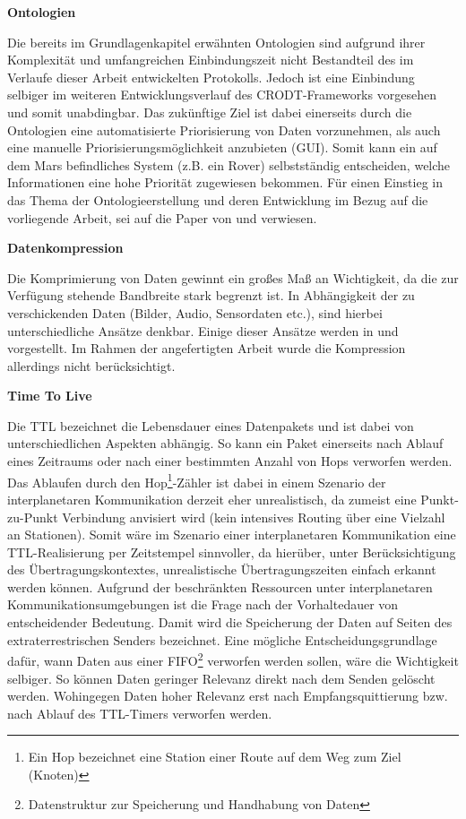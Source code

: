 \label{sec:Vorueberlegung}

\textbf{Ontologien}

Die bereits im Grundlagenkapitel erw{\"a}hnten Ontologien sind aufgrund ihrer
Komplexit{\"a}t und umfangreichen Einbindungszeit nicht Bestandteil des im
Verlaufe dieser Arbeit entwickelten Protokolls. Jedoch ist eine Einbindung
selbiger im weiteren Entwicklungsverlauf des CRODT-Frameworks vorgesehen und
somit unabdingbar.
Das zuk{\"u}nftige Ziel ist dabei einerseits durch die Ontologien eine
automatisierte Priorisierung von Daten vorzunehmen, als auch eine manuelle
Priorisierungsm{\"o}glichkeit anzubieten (\gls{GUI}). Somit kann ein auf dem
Mars befindliches System (z.B. ein Rover) selbstst{\"a}ndig entscheiden, welche
Informationen eine hohe Priorit{\"a}t zugewiesen bekommen. F{\"u}r einen
Einstieg in das Thema der Ontologieerstellung und deren Entwicklung im Bezug
auf die vorliegende Arbeit, sei auf die Paper von \cite{Noy2000} und \cite{Daher} verwiesen.

\textbf{Datenkompression}

Die Komprimierung von Daten gewinnt ein gro{\ss}es Ma{\ss} an Wichtigkeit, da
die zur Verf{\"u}gung stehende Bandbreite stark begrenzt ist. In Abh{\"a}ngigkeit der zu
verschickenden Daten (Bilder, Audio, Sensordaten etc.), sind hierbei
unterschiedliche Ans{\"a}tze denkbar. Einige dieser Ans{\"a}tze werden in
\cite{Kiely2006} und \cite{Kiely2007} vorgestellt. Im Rahmen der angefertigten
Arbeit wurde die Kompression allerdings nicht ber{\"u}cksichtigt.

\textbf{Time To Live}

Die \gls{TTL} bezeichnet die Lebensdauer eines Datenpakets und ist
dabei von unterschiedlichen Aspekten abh{\"a}ngig. So kann ein Paket einerseits nach
Ablauf eines Zeitraums oder nach einer bestimmten Anzahl
von Hops verworfen werden. Das Ablaufen durch den Hop\footnote{Ein Hop
bezeichnet eine Station einer Route auf dem Weg zum Ziel (Knoten)}-Zähler
ist dabei in einem Szenario der interplanetaren Kommunikation derzeit eher
unrealistisch, da zumeist eine Punkt-zu-Punkt Verbindung anvisiert wird (kein
intensives Routing {\"u}ber eine Vielzahl an Stationen). Somit w{\"a}re im
Szenario einer interplanetaren Kommunikation eine \gls{TTL}-Realisierung per
Zeitstempel sinnvoller, da hier{\"u}ber, unter Ber{\"u}cksichtigung des
{\"U}bertragungskontextes, unrealistische {\"U}bertragungszeiten einfach erkannt werden k{\"o}nnen.
Aufgrund der beschr{\"a}nkten Ressourcen unter interplanetaren
Kommunikationsumgebungen ist die Frage nach der Vorhaltedauer von
entscheidender Bedeutung. Damit wird die Speicherung der
Daten auf Seiten des extraterrestrischen Senders bezeichnet. 
Eine m{\"o}gliche Entscheidungsgrundlage daf{\"u}r, wann Daten aus einer
\gls{FIFO}\footnote{Datenstruktur zur Speicherung und Handhabung von Daten}
verworfen werden sollen, w{\"a}re die Wichtigkeit selbiger. So k{\"o}nnen Daten
geringer Relevanz direkt nach dem Senden gel{\"o}scht werden.
Wohingegen Daten hoher Relevanz erst nach Empfangsquittierung bzw. nach Ablauf
des \gls{TTL}-Timers verworfen werden.

